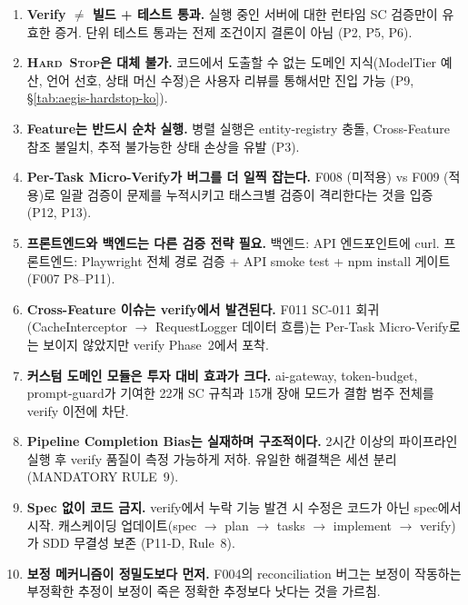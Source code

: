 \documentclass[11pt,a4paper,openright,twoside]{report}
\newcommand{\hardstop}{\textsc{Hard~Stop}}
\begin{document}
\begin{enumerate}[nosep]
  \item \textbf{Verify $\neq$ 빌드 + 테스트 통과.} 실행 중인 서버에 대한 런타임 SC 검증만이 유효한 증거. 단위 테스트 통과는 전제 조건이지 결론이 아님 (P2, P5, P6).
  \item \textbf{\hardstop{}은 대체 불가.} 코드에서 도출할 수 없는 도메인 지식(ModelTier 예산, 언어 선호, 상태 머신 수정)은 사용자 리뷰를 통해서만 진입 가능 (P9, \S\ref{tab:aegis-hardstop-ko}).
  \item \textbf{Feature는 반드시 순차 실행.} 병렬 실행은 entity-registry 충돌, Cross-Feature 참조 불일치, 추적 불가능한 상태 손상을 유발 (P3).
  \item \textbf{Per-Task Micro-Verify가 버그를 더 일찍 잡는다.} F008 (미적용) vs F009 (적용)로 일괄 검증이 문제를 누적시키고 태스크별 검증이 격리한다는 것을 입증 (P12, P13).
  \item \textbf{프론트엔드와 백엔드는 다른 검증 전략 필요.} 백엔드: API 엔드포인트에 curl. 프론트엔드: Playwright 전체 경로 검증 + API smoke test + npm install 게이트 (F007 P8--P11).
  \item \textbf{Cross-Feature 이슈는 verify에서 발견된다.} F011 SC-011 회귀(CacheInterceptor $\to$ RequestLogger 데이터 흐름)는 Per-Task Micro-Verify로는 보이지 않았지만 verify Phase~2에서 포착.
  \item \textbf{커스텀 도메인 모듈은 투자 대비 효과가 크다.} ai-gateway, token-budget, prompt-guard가 기여한 22개 SC 규칙과 15개 장애 모드가 결함 범주 전체를 verify 이전에 차단.
  \item \textbf{Pipeline Completion Bias는 실재하며 구조적이다.} 2시간 이상의 파이프라인 실행 후 verify 품질이 측정 가능하게 저하. 유일한 해결책은 세션 분리 (MANDATORY RULE~9).
  \item \textbf{Spec 없이 코드 금지.} verify에서 누락 기능 발견 시 수정은 코드가 아닌 spec에서 시작. 캐스케이딩 업데이트(spec $\to$ plan $\to$ tasks $\to$ implement $\to$ verify)가 SDD 무결성 보존 (P11-D, Rule~8).
  \item \textbf{보정 메커니즘이 정밀도보다 먼저.} F004의 reconciliation 버그는 보정이 작동하는 부정확한 추정이 보정이 죽은 정확한 추정보다 낫다는 것을 가르침.
\end{enumerate}


\appendix

\end{document}
